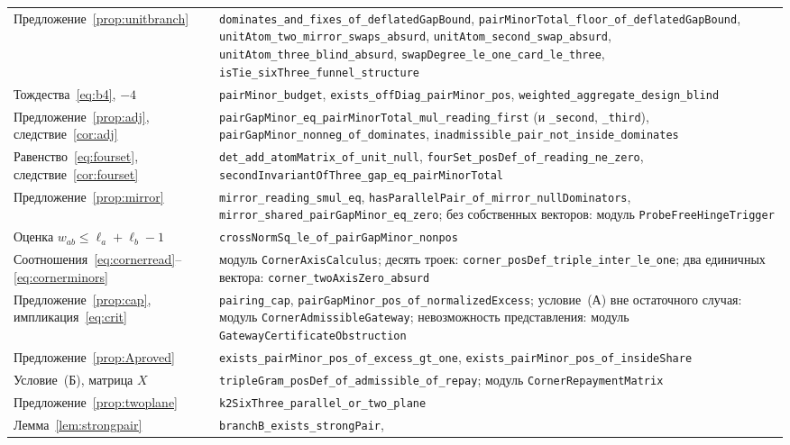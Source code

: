 \documentclass[11pt,a4paper]{article}
\theoremstyle{plain}
\theoremstyle{definition}
\theoremstyle{remark}
\newcommand{\code}[1]{\texttt{\small #1}}
\begin{document}
\begin{longtable}{@{}>{\raggedright\arraybackslash}p{}>{\raggedright\arraybackslash}p{}@{}}
Предложение~\ref{prop:unitbranch} & \code{dominates\_and\_fixes\_of\_deflatedGapBound},
  \code{pairMinorTotal\_floor\_of\_deflatedGapBound},
  \code{unitAtom\_two\_mirror\_swaps\_absurd},
  \code{unitAtom\_second\_swap\_absurd},
  \code{unitAtom\_three\_blind\_absurd},
  \code{swapDegree\_le\_one\_card\_le\_three},
  \code{isTie\_sixThree\_funnel\_structure}\\
Тождества~\eqref{eq:b4}, $-4$ & \code{pairMinor\_budget},
  \code{exists\_offDiag\_pairMinor\_pos},
  \code{weighted\_aggregate\_design\_blind}\\
Предложение~\ref{prop:adj}, следствие~\ref{cor:adj} &
  \code{pairGapMinor\_eq\_pairMinorTotal\_mul\_reading\_first} (и \code{\_second}, \code{\_third}),
  \code{pairGapMinor\_nonneg\_of\_dominates},
  \code{inadmissible\_pair\_not\_inside\_dominates}\\
Равенство~\eqref{eq:fourset}, следствие~\ref{cor:fourset} &
  \code{det\_add\_atomMatrix\_of\_unit\_null},
  \code{fourSet\_posDef\_of\_reading\_ne\_zero},
  \code{secondInvariantOfThree\_gap\_eq\_pairMinorTotal}\\
Предложение~\ref{prop:mirror} & \code{mirror\_reading\_smul\_eq},
  \code{hasParallelPair\_of\_mirror\_nullDominators},
  \code{mirror\_shared\_pairGapMinor\_eq\_zero}; без собственных векторов:
  модуль \code{ProbeFreeHingeTrigger}\\
Оценка $w_{ab}\le\ell_a+\ell_b-1$ & \code{crossNormSq\_le\_of\_pairGapMinor\_nonpos}\\
Соотношения~\eqref{eq:cornerread}--\eqref{eq:cornerminors} &
  модуль \code{CornerAxisCalculus}; десять троек:
  \code{corner\_posDef\_triple\_inter\_le\_one}; два единичных вектора:
  \code{corner\_twoAxisZero\_absurd}\\
Предложение~\ref{prop:cap}, импликация~\eqref{eq:crit} &
  \code{pairing\_cap}, \code{pairGapMinor\_pos\_of\_normalizedExcess};
  условие~(А) вне остаточного случая: модуль \code{CornerAdmissibleGateway};
  невозможность представления: модуль \code{GatewayCertificateObstruction}\\
Предложение~\ref{prop:Aproved} & \code{exists\_pairMinor\_pos\_of\_excess\_gt\_one},
  \code{exists\_pairMinor\_pos\_of\_insideShare}\\
Условие~(Б), матрица $X$ & \code{tripleGram\_posDef\_of\_admissible\_of\_repay};
  модуль \code{CornerRepaymentMatrix}\\
Предложение~\ref{prop:twoplane} & \code{k2SixThree\_parallel\_or\_two\_plane}\\
Лемма~\ref{lem:strongpair} & \code{branchB\_exists\_strongPair},

\end{longtable}
\end{document}
